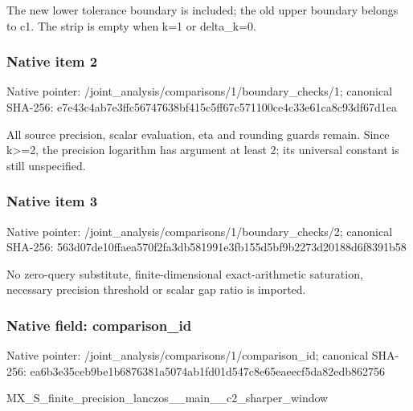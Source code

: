 \documentclass[10pt,a4paper]{article}
\begin{document}
\begingroup\raggedright\sloppy The new lower tolerance boundary is included;\allowbreak{} the old upper boundary belongs to c1. The strip is empty when k=\allowbreak{}1 or delta\_\allowbreak{}k=\allowbreak{}0.\par\endgroup

\subsubsection{Native item 2}
Native pointer: /joint\_\allowbreak{}analysis/comparisons/1/boundary\_\allowbreak{}checks/1; canonical SHA-256: e7e43c4ab7e3ffc56747638bf415c5ff67c571100ce4c33e61ca8c93df67d1ea

\begingroup\raggedright\sloppy All source precision,\allowbreak{} scalar evaluation,\allowbreak{} eta and rounding guards remain. Since k>=\allowbreak{}2,\allowbreak{} the precision logarithm has argument at least 2;\allowbreak{} its universal constant is still unspecified.\par\endgroup

\subsubsection{Native item 3}
Native pointer: /joint\_\allowbreak{}analysis/comparisons/1/boundary\_\allowbreak{}checks/2; canonical SHA-256: 563d07de10ffaea570f2fa3db581991e3fb155d5bf9b2273d20188d6f8391b58

\begingroup\raggedright\sloppy No zero-query substitute,\allowbreak{} finite-dimensional exact-arithmetic saturation,\allowbreak{} necessary precision threshold or scalar gap ratio is imported.\par\endgroup

\subsubsection{Native field: comparison\_\allowbreak{}id}
Native pointer: /joint\_\allowbreak{}analysis/comparisons/1/comparison\_\allowbreak{}id; canonical SHA-256: ea6b3e35ceb9be1b6876381a5074ab1fd01d547c8e65eaeecf5da82edb862756

\begingroup\raggedright\sloppy MX\_\allowbreak{}S\_\allowbreak{}finite\_\allowbreak{}precision\_\allowbreak{}lanczos\_\allowbreak{}\_\allowbreak{}main\_\allowbreak{}\_\allowbreak{}c2\_\allowbreak{}sharper\_\allowbreak{}window\par\endgroup
\end{document}
